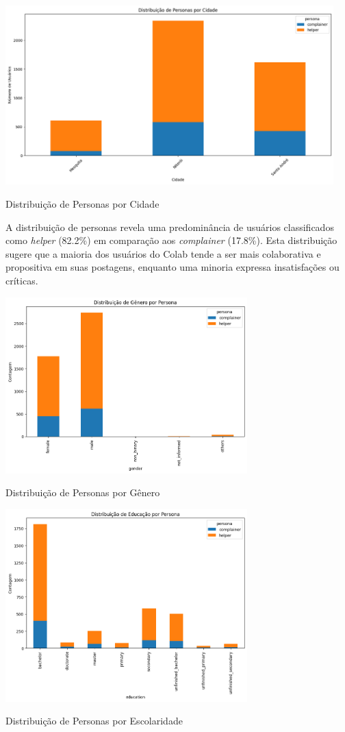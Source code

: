 \begin{quadro}[htb]
    \centering
    \includegraphics[width=0.95\textwidth]{images/personas_city.png}
    \caption{Distribuição de Personas por Cidade}
    \label{fig:personas_city}
\end{quadro}

A distribuição de personas revela uma predominância de usuários classificados como \textit{helper} (82.2\%) em comparação aos \textit{complainer} (17.8\%). Esta distribuição sugere que a maioria dos usuários do Colab tende a ser mais colaborativa e propositiva em suas postagens, enquanto uma minoria expressa insatisfações ou críticas. 

\begin{quadro}[htb]
    \centering
    \includegraphics[width=0.7\textwidth]{images/persona_gender.png}
    \caption{Distribuição de Personas por Gênero}
    \label{fig:persona_gender}
\end{quadro}

\begin{quadro}[htb]
    \centering
    \includegraphics[width=0.7\textwidth]{images/persona_education.png}
    \caption{Distribuição de Personas por Escolaridade}
    \label{fig:persona_education}
\end{quadro}

